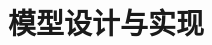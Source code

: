 \documentclass[UTF8,oneside,openright,fontset=none]{ctexbook}
\numberwithin{equation}{chapter}
\newcommand{\TODO}[1]{\textcolor{red}{[TODO: #1]}}
\begin{document}





\chapter{模型设计与实现}
\end{document}
